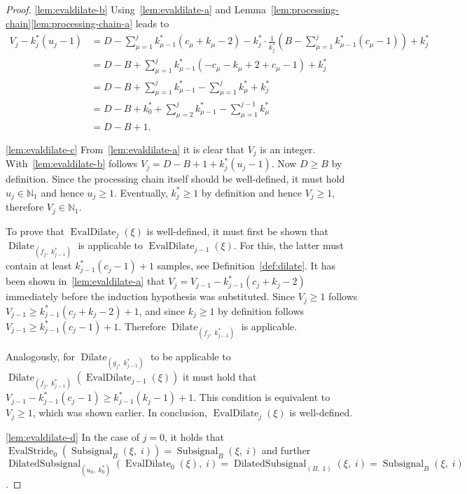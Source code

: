 \documentclass[journal]{IEEEtran}
\newcommand{\N}{\mathbb{N}}
\newcommand{\ROI}{B}
\DeclareMathOperator{\Subsignal}{Subsignal}
\DeclareMathOperator{\EvalStride}{EvalStride}
\DeclareMathOperator{\DilatedSubsignal}{DilatedSubsignal}
\DeclareMathOperator{\Dilate}{Dilate}
\DeclareMathOperator{\EvalDilate}{EvalDilate}
\begin{document}
\begin{proof}
\ref{lem:evaldilate-b}
Using~\ref{lem:evaldilate-a} and Lemma~\ref{lem:processing-chain}\ref{lem:processing-chain-a} leads to
\begin{align*}
  V_j - k_j^*(u_j - 1)
  &= D - \sum\nolimits_{\mu = 1}^j k_{\mu - 1}^*(c_\mu + k_\mu - 2) - k_j^* \cdot \tfrac{1}{k_j^*}\left(\ROI - \sum\nolimits_{\mu = 1}^j k_{\mu - 1}^*(c_\mu - 1)\right) + k_j^*\\
  &= D - \ROI + \sum\nolimits_{\mu = 1}^j k_{\mu - 1}^*(-c_\mu - k_\mu + 2 + c_\mu - 1) + k_j^*\\
  &= D - \ROI + \sum\nolimits_{\mu = 1}^j k_{\mu - 1}^* - \sum\nolimits_{\mu = 1}^j k_\mu^* + k_j^*\\
  &= D - \ROI + k_0^* + \sum\nolimits_{\mu = 2}^j k_{\mu - 1}^* - \sum\nolimits_{\mu = 1}^{j - 1} k_\mu^*\\
  &= D - \ROI + 1\text{.}
\end{align*}

\ref{lem:evaldilate-c}
From~\ref{lem:evaldilate-a} it is clear that $V_j$ is an integer.
With~\ref{lem:evaldilate-b} follows $V_j = D - \ROI + 1 + k_j^*(u_j - 1)$.
Now $D \geq \ROI$ by definition.
Since the processing chain itself should be well-defined, it must hold $u_j\in\N_1$ and hence $u_j \geq 1$.
Eventually, $k_j^*\geq 1$ by definition and hence $V_j \geq 1$, therefore $V_j\in\N_1$.

To prove that $\EvalDilate_j(\xi)$ is well-defined, it must first be shown that $\Dilate_{(f_j,\; k_{j - 1}^*)}$ is applicable to $\EvalDilate_{j - 1}(\xi)$.
For this, the latter must contain at least $k_{j - 1}^*(c_j - 1) + 1$ samples, see Definition~\ref{def:dilate}.
It has been shown in~\ref{lem:evaldilate-a} that $V_j = V_{j - 1} - k_{j - 1}^*(c_j + k_j - 2)$ immediately before the induction hypothesis was substituted.
Since $V_j \geq 1$ follows $V_{j - 1} \geq k_{j - 1}^*(c_j + k_j - 2) + 1$, and since $k_j \geq 1$ by definition follows $V_{j - 1} \geq k_{j - 1}^*(c_j - 1) + 1$.
Therefore $\Dilate_{(f_j,\; k_{j - 1}^*)}$ is applicable.

Analogously, for $\Dilate_{(g_j,\; k_{j - 1}^*)}$ to be applicable to $\Dilate_{(f_j,\; k_{j - 1}^*)}( \EvalDilate_{j - 1}(\xi) )$ it must hold that $V_{j - 1} - k_{j - 1}^*(c_j - 1) \geq k_{j - 1}^*(k_j - 1) + 1$.
This condition is equivalent to $V_j \geq 1$, which was shown earlier.
In conclusion, $\EvalDilate_j(\xi)$ is well-defined.

\ref{lem:evaldilate-d}
In the case of $j = 0$, it holds that $\EvalStride_0(\Subsignal_\ROI(\xi,\; i)) = \Subsignal_\ROI(\xi,\; i)$ and further $\DilatedSubsignal_{(u_0,\; k_0^*)}(\EvalDilate_0(\xi),\; i) = \DilatedSubsignal_{(\ROI,\; 1)}(\xi,\; i) = \Subsignal_\ROI(\xi,\; i)$.


\end{proof}
\end{document}

